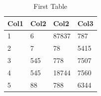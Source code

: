 \documentclass[12pt]{article}
\begin{document}
\begin{table}[h!]
  \caption{First Table}
  \begin{center}
    \begin{tabular}{||p{3cm}|p{3cm}|p{3cm}|p{3cm}||}
      \hline
      \hline
      Col1 & Col2 & Col2  & Col3 \\ [0.5ex]
      \hline\hline
      1    & 6    & 87837 & 787  \\
      \hline
      2    & 7    & 78    & 5415 \\
      \hline
      3    & 545  & 778   & 7507 \\
      \hline
      4    & 545  & 18744 & 7560 \\
      \hline
      5    & 88   & 788   & 6344 \\ [1ex]
      \hline
      \hline
    \end{tabular}
  \end{center}
\end{table}
\end{document}
